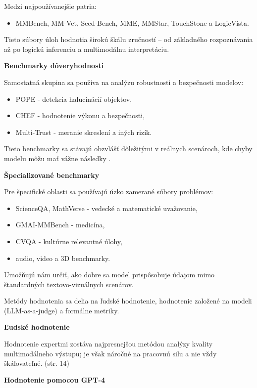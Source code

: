 \documentclass[]{tukediphc}
\begin{document}
Medzi najpoužívanejšie patria:
\begin{itemize}
\item MMBench, MM-Vet, Seed-Bench, MME, MMStar, TouchStone a LogicVista.
\end{itemize}

Tieto súbory úloh hodnotia širokú škálu zručností – od základného rozpoznávania až po logickú inferenciu a multimodálnu interpretáciu. \cite{researchgate:A_Survey_on_Evaluation_of_Multimodal_Large_Language_Models}

\textbf{Benchmarky dôveryhodnosti}

Samostatná skupina sa používa na analýzu robustnosti a bezpečnosti modelov:

\begin{itemize}
\item POPE - detekcia halucinácií objektov,
\item CHEF - hodnotenie výkonu a bezpečnosti,
\item Multi-Trust - meranie skreslení a iných rizík.
\end{itemize}


Tieto benchmarky sa stávajú obzvlášť dôležitými v reálnych scenároch, kde chyby modelu môžu mať vážne následky \cite{researchgate:A_Survey_on_Evaluation_of_Multimodal_Large_Language_Models}.

\textbf{Špecializované benchmarky}

Pre špecifické oblasti sa používajú úzko zamerané súbory problémov:
\begin{itemize}
\item ScienceQA, MathVerse - vedecké a matematické uvažovanie,
\item GMAI-MMBench - medicína,
\item CVQA - kultúrne relevantné úlohy,
\item audio, video a 3D benchmarky.
\end{itemize}

Umožňujú nám určiť, ako dobre sa model prispôsobuje údajom mimo štandardných textovo-vizuálnych scenárov.

Metódy hodnotenia sa delia na ľudské hodnotenie, hodnotenie založené na modeli (LLM-as-a-judge) a formálne metriky.

\textbf{Ľudské hodnotenie}

Hodnotenie expertmi zostáva najpresnejšou metódou analýzy kvality multimodálneho výstupu; je však náročné na pracovnú silu a nie vždy škálovateľné. (str. 14)

\textbf{Hodnotenie pomocou GPT-4}
\end{document}
